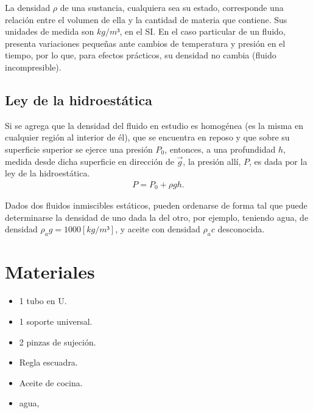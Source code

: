 \documentclass[a4paper, 12p]{article}
\begin{document}
La densidad $\rho$ de una sustancia, cualquiera sea su estado, corresponde una relación entre el volumen de ella y la cantidad de materia que contiene. Sus unidades de medida son $kg/m³$, en el SI. En el caso particular de un fluido, 
presenta variaciones pequeñas ante cambios de temperatura y presión en el tiempo, por lo que, para efectos prácticos, su densidad no cambia (fluido incompresible).

\subsection*{Ley de la hidroestática}
Si se agrega que la densidad del fluido en estudio es homogénea (es la misma en cualquier región al interior de él), que se encuentra en reposo y que sobre su superficie superior se ejerce una presión $P_0$, entonces, a una profundidad $h$, 
medida desde dicha superficie en dirección de $\vec{g}$, la presión allí, $P$, es dada por la ley de la hidroestática.
\begin{align}
      P=P_0 +  \rho gh.
\end{align}

Dados dos fluidos inmiscibles estáticos, pueden ordenarse de forma tal que puede determinarse la densidad de uno dada la del otro, por ejemplo, teniendo agua, de densidad $\rho_ag = 1000[kg/m³]$, y aceite con densidad $\rho_ac$ desconocida.


\newpage
\section{Materiales}


\begin{itemize}
      \item 1 tubo en U.
      \item 1 soporte universal.
      \item 2 pinzas de sujeción.
      \item Regla escuadra.
      \item Aceite de cocina.
      \item agua,
\end{itemize}    
\end{document}
